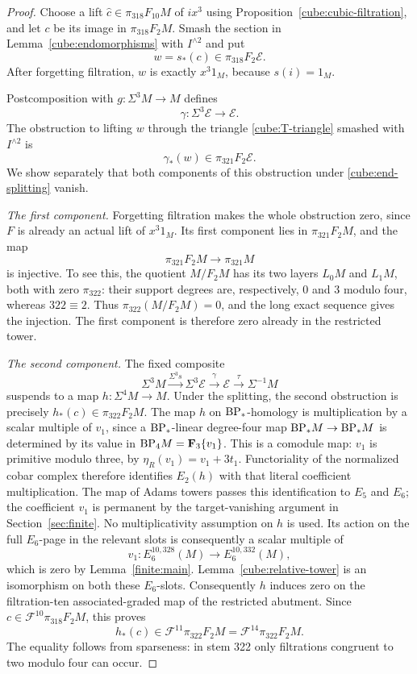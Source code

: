 \begin{proof}
Choose a lift
\(\widehat c\in\pi_{318}F_{10}M\) of \(ix^3\) using
Proposition~\ref{cube:cubic-filtration}, and let \(c\)
be its image in \(\pi_{318}F_2M\).  Smash the section
in Lemma~\ref{cube:endomorphisms} with \(I^{\wedge2}\)
and put
\[
 w=s_*(c)\in\pi_{318}F_2\mathcal E.
\]
After forgetting filtration, \(w\) is exactly
\(x^3 1_M\), because \(s(i)=1_M\).

Postcomposition with \(g:\Sigma^3M\to M\) defines
\[
 \gamma:\Sigma^3\mathcal E\longrightarrow\mathcal E.
\]
The obstruction to lifting \(w\) through the triangle
\eqref{cube:T-triangle} smashed with \(I^{\wedge2}\)
is
\[
 \gamma_*(w)\in\pi_{321}F_2\mathcal E.
\]
We show separately that both components of this
obstruction under \eqref{cube:end-splitting} vanish.

\emph{The first component.}
Forgetting filtration makes the whole obstruction
zero, since \(F\) is already an actual lift of
\(x^3 1_M\).  Its first component lies in
\(\pi_{321}F_2M\), and the map
\[
 \pi_{321}F_2M\longrightarrow\pi_{321}M
\]
is injective.  To see this, the quotient \(M/F_2M\)
has its two layers \(L_0M\) and \(L_1M\), both with
zero \(\pi_{322}\): their support degrees are,
respectively, \(0\) and \(3\) modulo four, whereas
\(322\equiv2\).  Thus \(\pi_{322}(M/F_2M)=0\), and
the long exact sequence gives the injection.
The first component is therefore zero already in
the restricted tower.

\emph{The second component.}
The fixed composite
\[
 \Sigma^3M\xrightarrow{\Sigma^3s}\Sigma^3\mathcal E
     \xrightarrow{\gamma}\mathcal E
     \xrightarrow{\tau}\Sigma^{-1}M
\]
suspends to a map \(h:\Sigma^4M\to M\).
Under the splitting, the second obstruction is
precisely \(h_*(c)\in\pi_{322}F_2M\).
The map \(h\) on \(\mathrm{BP}_*\)-homology is multiplication
by a scalar multiple of \(v_1\), since a
\(\mathrm{BP}_*\)-linear degree-four map
\(\mathrm{BP}_*M\to\mathrm{BP}_*M\) is determined by its value in
\(\mathrm{BP}_4M=\mathbf F_3\{v_1\}\).
This is a comodule map: \(v_1\) is primitive modulo three,
by \(\eta_R(v_1)=v_1+3t_1\).
Functoriality of the normalized cobar complex therefore
identifies \(E_2(h)\) with that literal coefficient
multiplication.  The map of Adams towers passes this
identification to \(E_5\) and \(E_6\); the coefficient
\(v_1\) is permanent by the target-vanishing argument in
Section~\ref{sec:finite}.
No multiplicativity assumption on \(h\) is used.
Its action on the full \(E_6\)-page in the
relevant slots is consequently a scalar multiple of
\begin{equation}\label{cube:v-obstruction}
 v_1:E_6^{10,328}(M)\longrightarrow E_6^{10,332}(M),
\end{equation}
which is zero by Lemma~\ref{finite:main}.
Lemma~\ref{cube:relative-tower} is an isomorphism on
both these \(E_6\)-slots.  Consequently \(h\) induces
zero on the filtration-ten associated-graded map
of the restricted abutment.  Since
\(c\in\mathcal F^{10}\pi_{318}F_2M\), this proves
\[
 h_*(c)\in\mathcal F^{11}\pi_{322}F_2M
          =\mathcal F^{14}\pi_{322}F_2M.
\]
The equality follows from sparseness: in stem 322
only filtrations congruent to two modulo four can
occur.


\end{proof}
